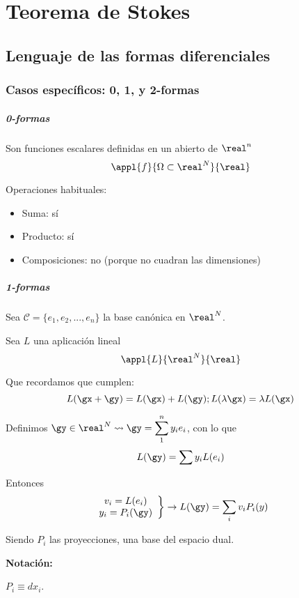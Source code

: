 \chapter{Teorema de Stokes}

\section{Lenguaje de las formas diferenciales}
\subsection{Casos específicos: 0, 1, y 2-formas}
\paragraph{0-formas}

Son funciones escalares definidas en un abierto de $\real^n$
\[\appl{f}{\Omega\subset\real^N}{\real}\]

Operaciones habituales:
\begin{itemize}
\item Suma: sí
\item Producto: sí
\item Composiciones: no (porque no cuadran las dimensiones)
\end{itemize}

\paragraph{1-formas}

Sea $\mathcal{C} = \{e_1,e_2,...,e_n\}$ la base canónica en $\real^N$.

Sea $L$ una aplicación lineal
\[\appl{L}{\real^N}{\real}\]

Que recordamos que cumplen:
\[ L(\gx+\gy) = L(\gx)+L(\gy); L(\lambda\gx) = \lambda L(\gx)\]

Definimos $\gy\in\real^N \leadsto \gy = \displaystyle\sum_1^n y_i e_i$, con lo que \[L(\gy) = \sum y_i L(e_i)\]

Entonces \[\left.\begin{array}{cc}
v_i = L(e_i)\\
y_i = P_i(\gy)
\end{array}\right\} \rightarrow L(\gy) = \sum_i v_iP_i(y)\]

Siendo $P_i$ las proyecciones, una base del espacio dual.

\textbf{Notación:}

$P_i \equiv dx_i$.

